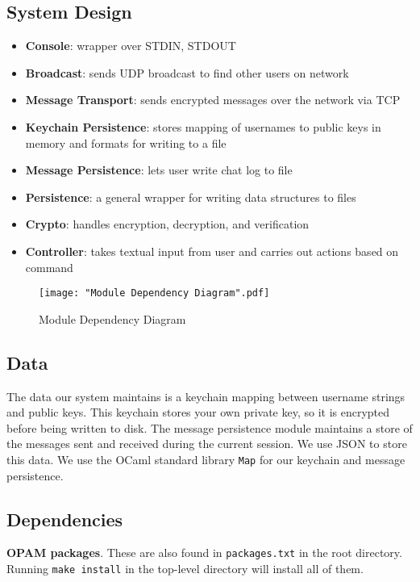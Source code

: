 \documentclass{scrartcl}
\begin{document}
\subsection{System Design}
\begin{itemize}
	\item \textbf{Console}: wrapper over STDIN, STDOUT
	\item \textbf{Broadcast}: sends UDP broadcast to find other users on network
	\item \textbf{Message Transport}: sends encrypted messages over the network via TCP
	\item \textbf{Keychain Persistence}: stores mapping of usernames to public keys in memory and formats for writing to a file
	\item \textbf{Message Persistence}: lets user write chat log to file
	\item \textbf{Persistence}: a general wrapper for writing data structures to files
	\item \textbf{Crypto}: handles encryption, decryption, and verification
	\item \textbf{Controller}: takes textual input from user and carries out actions based on command
\end{itemize}
\begin{figure}[H]
	\texttt{[image: "Module Dependency Diagram".pdf]}
	\caption{Module Dependency Diagram}
\end{figure}
\subsection{Data}

The data our system maintains is a keychain mapping between username strings and public keys. This keychain stores your own private key, so it is encrypted before being written to disk. The message persistence module maintains a store of the messages sent and received during the current session. We use JSON to store this data. We use the OCaml standard library \texttt{Map} for our keychain and message persistence.

\subsection{Dependencies}

\textbf{OPAM packages}. These are also found in  \texttt{packages.txt} in the root directory. Running \texttt{make install} in the top-level directory will install all of them.
\end{document}
